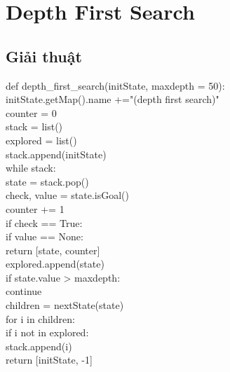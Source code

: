 \documentclass[11pt,a4paper]{article}
\begin{document}
\tableofcontents
\newpage
\section {Depth First Search}
\subsection{Giải thuật}
\begin{flushleft}
\hspace{2 cm}	def depth\_first\_search(initState, maxdepth = 50):\\
\hspace{3 cm}	initState.getMap().name +="(depth first search)"\\
\hspace{3 cm}	counter = 0\\
\hspace{3 cm}	stack = list()\\
\hspace{3 cm}	explored = list()\\
\hspace{3 cm}	stack.append(initState)\\
\hspace{3 cm}	while stack:\\
\hspace{4 cm}	state = stack.pop()\\
\hspace{4 cm}	check, value = state.isGoal()\\
\hspace{4 cm}	counter += 1\\
\hspace{4 cm}	if check == True:\\
\hspace{5 cm}	if value == None:\\
\hspace{6 cm}	return [state, counter]\\
\hspace{4 cm}	explored.append(state)\\
\hspace{4 cm}	if state.value > maxdepth:\\
\hspace{5 cm}	continue\\
\hspace{4 cm}	children = nextState(state)\\
\hspace{4 cm}	for i in children:\\
\hspace{5 cm}	if i not in explored:\\
\hspace{6 cm}	stack.append(i)\\
\hspace{3 cm}	return [initState, -1]\\
\end{flushleft}
\newpage
\end{document}
